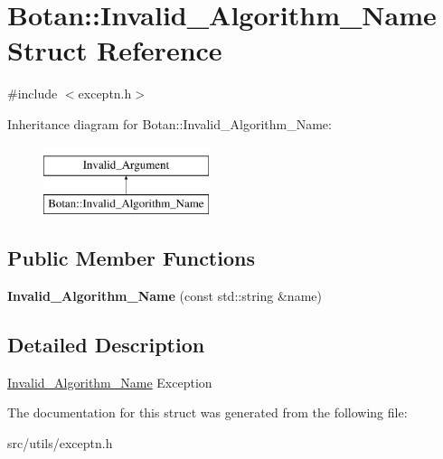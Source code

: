 \hypertarget{structBotan_1_1Invalid__Algorithm__Name}{\section{Botan\-:\-:Invalid\-\_\-\-Algorithm\-\_\-\-Name Struct Reference}
\label{structBotan_1_1Invalid__Algorithm__Name}
}


{\ttfamily \#include $<$exceptn.\-h$>$}

Inheritance diagram for Botan\-:\-:Invalid\-\_\-\-Algorithm\-\_\-\-Name\-:\begin{figure}[H]
\begin{center}
\leavevmode
\includegraphics[height=2.000000cm]{structBotan_1_1Invalid__Algorithm__Name}
\end{center}
\end{figure}
\subsection*{Public Member Functions}
\begin{DoxyCompactItemize}
\item 
\hypertarget{structBotan_1_1Invalid__Algorithm__Name_af182bc25d3cfe44a5724da853a2edf1f}{{\bfseries Invalid\-\_\-\-Algorithm\-\_\-\-Name} (const std\-::string \&name)}\label{structBotan_1_1Invalid__Algorithm__Name_af182bc25d3cfe44a5724da853a2edf1f}

\end{DoxyCompactItemize}


\subsection{Detailed Description}
\hyperlink{structBotan_1_1Invalid__Algorithm__Name}{Invalid\-\_\-\-Algorithm\-\_\-\-Name} Exception 

The documentation for this struct was generated from the following file\-:\begin{DoxyCompactItemize}
\item 
src/utils/exceptn.\-h\end{DoxyCompactItemize}
